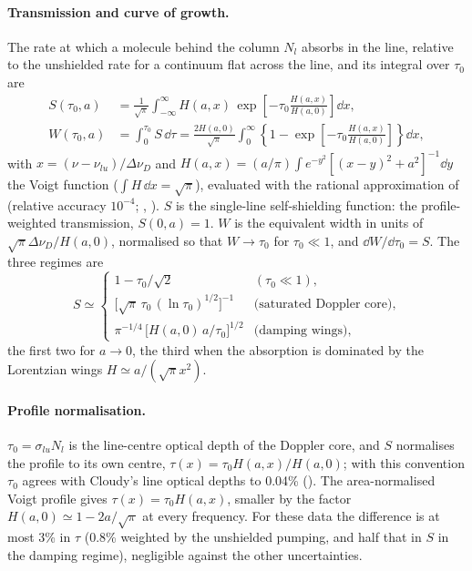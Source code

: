 \paragraph{Transmission and curve of growth.} The rate at which a molecule
behind the column $N_l$ absorbs in the line, relative to the unshielded rate
for a continuum flat across the line, and its integral over $\tau_0$ are
\begin{align}
  S(\tau_0,a) &= \frac{1}{\sqrt\pi}\int_{-\infty}^{\infty} H(a,x)\,
       \exp\!\left[-\tau_0\frac{H(a,x)}{H(a,0)}\right]\dd x,
  \label{eq:SW}\\
  W(\tau_0,a) &= \int_0^{\tau_0} S\,\dd\tau
      = \frac{2H(a,0)}{\sqrt\pi}\int_0^{\infty}\left\{1-\exp\!\left[-\tau_0\frac{H(a,x)}{H(a,0)}\right]\right\}\dd x ,
  \label{eq:W}
\end{align}
with $x=(\nu-\nu_{lu})/\Delta\nu_D$ and $H(a,x)=(a/\pi)\int e^{-y^2}[(x-y)^2+a^2]^{-1}\dd y$
the Voigt function ($\int H\,\dd x=\sqrt\pi$), evaluated with the rational
approximation of \citet{Humlicek1982} (relative accuracy $10^{-4}$; ,
). $S$ is the single-line self-shielding
function: the profile-weighted transmission, $S(0,a)=1$. $W$ is the equivalent
width in units of $\sqrt\pi\Delta\nu_D/H(a,0)$, normalised so that $W\to\tau_0$ for
$\tau_0\ll1$, and $\dd W/\dd\tau_0=S$. The three regimes are
\begin{equation}
  S \simeq \begin{cases}
    1-\tau_0/\sqrt2 & (\tau_0\ll1),\\[2pt]
    \bigl[\sqrt\pi\,\tau_0\,(\ln\tau_0)^{1/2}\bigr]^{-1} & \text{(saturated Doppler core)},\\[2pt]
    \pi^{-1/4}\,\bigl[H(a,0)\,a/\tau_0\bigr]^{1/2} & \text{(damping wings)},
  \end{cases}
  \label{eq:Sasym}
\end{equation}
the first two for $a\to0$, the third when the absorption is dominated by the
Lorentzian wings $H\simeq a/(\sqrt\pi x^2)$.

\paragraph{Profile normalisation.} $\tau_0=\sigma_{lu}N_l$ is the line-centre
optical depth of the Doppler core, and $S$ normalises the profile to its own
centre, $\tau(x)=\tau_0H(a,x)/H(a,0)$; with this convention $\tau_0$ agrees with
Cloudy's line optical depths to 0.04\% (). The area-normalised Voigt
profile gives $\tau(x)=\tau_0H(a,x)$, smaller by the factor
$H(a,0)\simeq1-2a/\sqrt\pi$ at every frequency. For these data the difference is
at most 3\% in $\tau$ (0.8\% weighted by the unshielded pumping, and half that in
$S$ in the damping regime), negligible against the other uncertainties.

